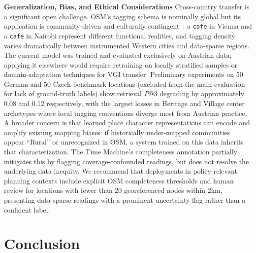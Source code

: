 \documentclass[]{interact}
\theoremstyle{plain}%
\theoremstyle{definition}
\theoremstyle{remark}
\begin{document}
\textbf{Generalization, Bias, and Ethical Considerations} Cross-country transfer is a significant open challenge. OSM's tagging schema is nominally global but its application is community-driven and culturally contingent~\citep{haklay2010good, Fonte-2017}: a \texttt{cafe} in Vienna and a \texttt{cafe} in Nairobi represent different functional realities, and tagging density varies dramatically between instrumented Western cities and data-sparse regions. The current model was trained and evaluated exclusively on Austrian data; applying it elsewhere would require retraining on locally stratified samples or domain-adaptation techniques for VGI transfer. Preliminary experiments on 50 German and 50 Czech benchmark locations (excluded from the main evaluation for lack of ground-truth labels) show retrieval $P@3$ degrading by approximately 0.08 and 0.12 respectively, with the largest losses in Heritage and Village center archetypes where local tagging conventions diverge most from Austrian practice. A broader concern is that learned place character representations can encode and amplify existing mapping biases: if historically under-mapped communities appear ``Rural'' or unrecognized in OSM, a system trained on this data inherits that characterization. The Time Machine's completeness annotation partially mitigates this by flagging coverage-confounded readings, but does not resolve the underlying data inequity. We recommend that deployments in policy-relevant planning contexts include explicit OSM completeness thresholds and human review for locations with fewer than 20 georeferenced nodes within 2km, presenting data-sparse readings with a prominent uncertainty flag rather than a confident label.

\section{Conclusion}
\label{sec:conclusion}
\end{document}
